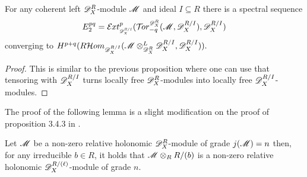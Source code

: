 \begin{proposition}
  For any coherent left $\mathscr{D}_X^R$-module $\mathscr{M}$ and ideal $I\subseteq R$ there is a spectral sequence
  $$E_2^{pq}= \Ex{\D_X^{R/I}}{p}(\Tr{\D_X^R}{-q}(\M,\D_X^{R/I}), \D_X^{R/I}) $$
  converging to $H^{p+q}(R\mathcal{H}om_{\mathscr{D}_X^{R/I}}(\mathscr{M}\otimes_{\mathscr{D}_X^R}^L \mathscr{D}_X^{R/I},\mathscr{D}_X^{R/I})).$
\end{proposition}
\begin{proof}
  This is similar to the previous proposition where one can use that tensoring with $\mathscr{D}_X^{R/I}$ turns locally free $\mathscr{D}_X^R$-modules into locally free $\mathscr{D}_X^{R/I}$-modules.
\end{proof}

The proof of the following lemma is a slight modification on the proof of proposition 3.4.3 in \cite{budur2019zero}.
\begin{lemma}\label{lem: RestrictToCM}
  Let $\mathscr{M}$ be a non-zero relative holonomic $\mathscr{D}_X^R$-module of grade $j(\mathscr{M}) = n$  then, for any irreducible $b\in R$, it holds that $\mathscr{M} \otimes_R R/(b)$ is a non-zero relative holonomic  $\mathscr{D}_X^{R/(\ell)}$-module of grade $n$.
\end{lemma}
